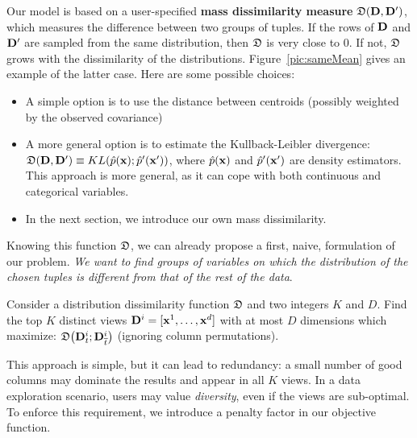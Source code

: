 Our model is based on a user-specified \textbf{mass dissimilarity measure}
$\mathfrak{D}(\mathbf{D}, \mathbf{D}')$, which measures the difference between two groups of
tuples. If the rows of $\mathbf{D}$ and $\mathbf{D}'$ are sampled from the same
distribution, then $\mathfrak{D}$ is very close to 0. If
not, $\mathfrak{D}$ grows with the dissimilarity of the distributions.
Figure~\ref{pic:sameMean} gives an example of the latter case.  Here are some
possible choices:
\begin{itemize}
    \item A simple option is to use the distance between centroids (possibly
        weighted by the observed covariance)
    \item A more general option is to estimate the Kullback-Leibler divergence:
        $\mathfrak{D}(\mathbf{D}, \mathbf{D}') \equiv KL(\hat{p}(\mathbf{x});
        \hat{p}'(\mathbf{x}'))$, where $\hat{p}(\mathbf{x})$ and $\hat{p}'(\mathbf{x}')$
        are density estimators. This approach is more general, as it can cope
        with both continuous and categorical variables.
    \item In the next section, we introduce our own mass dissimilarity.
\end{itemize}
Knowing this function $\mathfrak{D}$, we can already propose a first, naive,
formulation of our problem. \emph{We want to find groups of variables on which the
distribution of the chosen tuples is different from that of the rest of the
data}.
\begin{problem}
    Consider a distribution dissimilarity function $\mathfrak{D}$ and two integers
    $K$ and $D$. Find the top $K$ distinct views $\mathbf{D}^i = [\mathbf{x}^1, \dots,
    \mathbf{x}^d]$ with at most $D$ dimensions which maximize: $ \mathfrak{D}\big(
    \mathbf{D}^i_t ; \mathbf{D}^i_{\overline{t}} \big)$ (ignoring column permutations).
\end{problem}

This approach is simple, but it can lead to redundancy: a small number
of good columns may dominate the results and appear in all $K$ views. In a data
exploration scenario, users may value \emph{diversity}, even if the views are
sub-optimal. To enforce this requirement, we introduce a penalty factor in our
objective function. 

